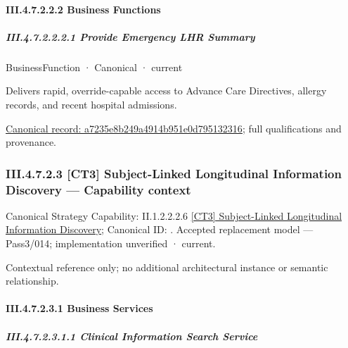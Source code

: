 \paragraph*{III.4.7.2.2.2 Business Functions}
\label{navigation:III.4.7.2.2.2}

\subparagraph*{III.4.7.2.2.2.1 Provide Emergency LHR Summary}
\label{navigation:III.4.7.2.2.2.1}

\label{element:a7235e8b249a4914b951e0d795132316}
{\small BusinessFunction · Canonical · current}\par

Delivers rapid, override-capable access to Advance Care Directives, allergy records, and recent hospital admissions.


{\footnotesize \href{../../../../../../../../continuum/business/business-function/a7235e8b249a4914b951e0d795132316.md}{Canonical record: a7235e8b249a4914b951e0d795132316}; full qualifications and provenance.}\par
\subsubsection*{III.4.7.2.3 [CT3] Subject-Linked Longitudinal Information Discovery — Capability context}
\label{navigation:III.4.7.2.3}

{\small Canonical Strategy Capability: II.1.2.2.2.6 \hyperref[element:645372b4e7eb431d916ff3254f11689b]{[CT3] Subject-Linked Longitudinal Information Discovery}; Canonical ID: \texttt{}. Accepted replacement model — Pass3/014; implementation unverified · current.}\par
Contextual reference only; no additional architectural instance or semantic relationship.\par
\paragraph*{III.4.7.2.3.1 Business Services}
\label{navigation:III.4.7.2.3.1}

\subparagraph*{III.4.7.2.3.1.1 Clinical Information Search Service}
\label{navigation:III.4.7.2.3.1.1}

